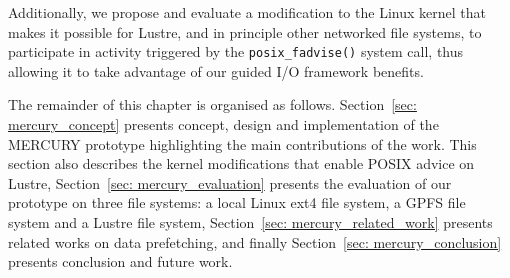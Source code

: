 Additionally, we propose and evaluate a modification to the Linux kernel that makes it possible for Lustre, and in principle other networked file systems, to participate in activity triggered by the \texttt{posix\_fadvise()} system call, thus allowing it to take advantage of our guided I/O framework benefits.

The remainder of this chapter is organised as follows. Section~\ref{sec: mercury_concept} presents concept, design and implementation of the MERCURY prototype highlighting the main contributions of the work. This section also describes the kernel modifications that enable POSIX advice on Lustre, Section~\ref{sec: mercury_evaluation} presents the evaluation of our prototype on three file systems: a local Linux ext4 file system, a GPFS file system and a Lustre file system, Section~\ref{sec: mercury_related_work} presents related works on data prefetching, and finally Section~\ref{sec: mercury_conclusion} presents conclusion and future work.
